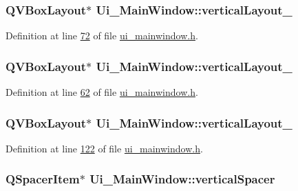 \hypertarget{a00080_afcc20a3d5058037a00cdc6122f231848}{
\subsubsection[{vertical\+Layout\+\_\+5}]{\setlength{\rightskip}{0pt plus 5cm}Q\+V\+Box\+Layout$\ast$ Ui\+\_\+\+Main\+Window\+::vertical\+Layout\+\_}}\label{a00080_afcc20a3d5058037a00cdc6122f231848}


Definition at line \hyperlink{a00139_source_l00072}{72} of file \hyperlink{a00139_source}{ui\+\_\+mainwindow.\+h}.

\hypertarget{a00080_a93c190b085c63a667c535ba0bbcfec7c}{
\subsubsection[{vertical\+Layout\+\_\+6}]{\setlength{\rightskip}{0pt plus 5cm}Q\+V\+Box\+Layout$\ast$ Ui\+\_\+\+Main\+Window\+::vertical\+Layout\+\_}}\label{a00080_a93c190b085c63a667c535ba0bbcfec7c}


Definition at line \hyperlink{a00139_source_l00062}{62} of file \hyperlink{a00139_source}{ui\+\_\+mainwindow.\+h}.

\hypertarget{a00080_a7b66d5d6ab55f3977317359d09a42345}{
\subsubsection[{vertical\+Layout\+\_\+7}]{\setlength{\rightskip}{0pt plus 5cm}Q\+V\+Box\+Layout$\ast$ Ui\+\_\+\+Main\+Window\+::vertical\+Layout\+\_}}\label{a00080_a7b66d5d6ab55f3977317359d09a42345}


Definition at line \hyperlink{a00139_source_l00122}{122} of file \hyperlink{a00139_source}{ui\+\_\+mainwindow.\+h}.

\hypertarget{a00080_a8384329c3663ff274e926a12024aab52}{
\subsubsection[{vertical\+Spacer}]{\setlength{\rightskip}{0pt plus 5cm}Q\+Spacer\+Item$\ast$ Ui\+\_\+\+Main\+Window\+::vertical\+Spacer}}\label{a00080_a8384329c3663ff274e926a12024aab52}



